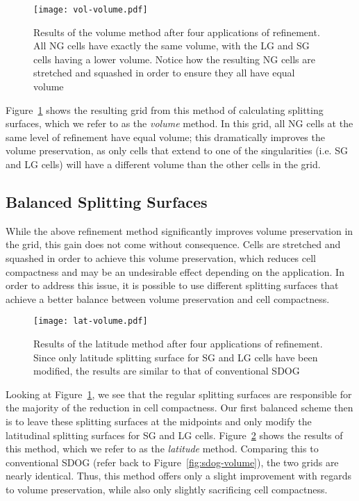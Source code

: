 \begin{figure}[ht!]
	\centering
	\texttt{[image: vol-volume.pdf]}
	\caption[Visualization of cell volumes in the volume modification]{
		Results of the volume method after four applications of refinement.
		All NG cells have exactly the same volume, with the LG and SG cells having a lower volume.
		Notice how the resulting NG cells are stretched and squashed in order to ensure they all have equal volume
	}
	\label{fig:modified-volume}
\end{figure}


Figure~\ref{fig:modified-volume} shows the resulting grid from this method of calculating splitting surfaces, which we refer to as the \textit{volume} method.
In this grid, all NG cells at the same level of refinement have equal volume; this dramatically improves the volume preservation, as only cells that extend to one of the singularities (i.e. SG and LG cells) will have a different volume than the other cells in the grid.


\subsection{Balanced Splitting Surfaces} \label{chap:4:balanced}
While the above refinement method significantly improves volume preservation in the grid, this gain does not come without consequence.
Cells are stretched and squashed in order to achieve this volume preservation, which reduces cell compactness and may be an undesirable effect depending on the application.
In order to address this issue, it is possible to use different splitting surfaces that achieve a better balance between volume preservation and cell compactness.


\begin{figure}[ht!]
	\centering
	\texttt{[image: lat-volume.pdf]}
	\caption[Visualization of cell volumes in the latitude modification]{
		Results of the latitude method after four applications of refinement.
		Since only latitude splitting surface for SG and LG cells have been modified, the results are similar to that of conventional SDOG
	}
	\label{fig:latitude-volume}
\end{figure}


Looking at Figure~\ref{fig:modified-volume}, we see that the regular splitting surfaces are responsible for the majority of the reduction in cell compactness.
Our first balanced scheme then is to leave these splitting surfaces at the midpoints and only modify the latitudinal splitting surfaces for SG and LG cells.
Figure~\ref{fig:latitude-volume} shows the results of this method, which we refer to as the \textit{latitude} method.
Comparing this to conventional SDOG (refer back to Figure~\ref{fig:sdog-volume}), the two grids are nearly identical.
Thus, this method offers only a slight improvement with regards to volume preservation, while also only slightly sacrificing cell compactness.


